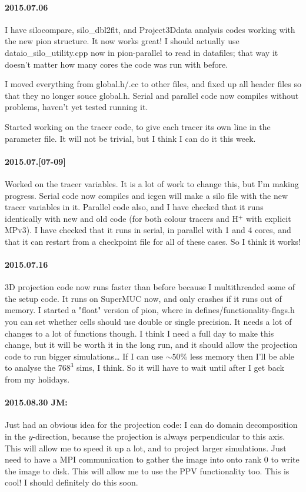 \documentclass[a4paper,11pt]{article}
\begin{document}
\paragraph{2015.07.06}
I have silocompare, silo\_dbl2flt, and Project3Ddata analysis codes working with the new pion structure.
It now works great!  I should actually use dataio\_silo\_utility.cpp now in pion-parallel to read in datafiles; that way it doesn't matter how many cores the code was run with before.

I moved everything from global.h/.cc to other files, and fixed up all header files so that they no longer souce global.h.
Serial and parallel code now compiles without problems, haven't yet tested running it.

Started working on the tracer code, to give each tracer its own line in the parameter file.
It will not be trivial, but I think I can do it this week.

\paragraph{2015.07.[07-09]}
Worked on the tracer variables.  It is a lot of work to change this, but I'm making progress.
Serial code now compiles and icgen will make a silo file with the new tracer variables in it.
Parallel code also, and I have checked that it runs identically with new and old code (for both colour tracers and H$^{+}$ with explicit MPv3).
I have checked that it runs in serial, in parallel with 1 and 4 cores, and that it can restart from a checkpoint file for all of these cases.
So I think it works!

\paragraph{2015.07.16}
3D projection code now runs faster than before because I multithreaded some of the setup code.
It runs on SuperMUC now, and only crashes if it runs out of memory.
I started a "float" version of pion, where in defines/functionality-flags.h you can set whether cells should use double or single precision.
It needs a lot of changes to a lot of functions though.
I think I need a full day to make this change, but it will be worth it in the long run, and it should allow the projection code to run bigger simulations\ldots
If I can use $\sim50$\% less memory then I'll be able to analyse the $768^3$ sims, I think.
So it will have to wait until after I get back from my holidays.

\paragraph{2015.08.30 JM:}
Just had an obvious idea for the projection code: I can do domain decomposition in the $y$-direction, because the projection is always perpendicular to this axis.
This will allow me to speed it up a lot, and to project larger simulations.
Just need to have a MPI communication to gather the image into onto rank 0 to write the image to disk.
This will allow me to use the PPV functionality too.
This is cool!  I should definitely do this soon.
\end{document}

